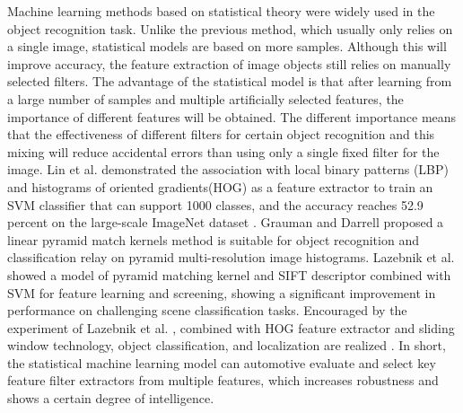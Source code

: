 \documentclass[10pt, a4paper]{article}
\begin{document}
\begin{multicols}{2}
	\par
	Machine learning methods based on statistical theory were widely used in the object recognition task. Unlike the previous method, which usually only relies on a single image, statistical models are based on more samples. Although this will improve accuracy, the feature extraction of image objects still relies on manually selected filters. The advantage of the statistical model is that after learning from a large number of samples and multiple artificially selected features, the importance of different features will be obtained. The different importance means that the effectiveness of different filters for certain object recognition and this mixing will reduce accidental errors than using only a single fixed filter for the image. Lin et al. \cite{lin2011large} demonstrated the association with local binary patterns (LBP) and histograms of oriented gradients(HOG) as a feature extractor to train an SVM classifier that can support 1000 classes, and the accuracy reaches 52.9 percent on the large-scale ImageNet dataset \cite{dalal2005histograms}\cite{wang2009hog}\cite{deng2009imagenet}. Grauman and Darrell \cite{grauman2005pyramid} proposed a linear pyramid match kernels method is suitable for object recognition and classification relay on pyramid multi-resolution image histograms. Lazebnik et al. \cite{lazebnik2006beyond} showed a model of pyramid matching kernel and SIFT descriptor combined with SVM for feature learning and screening, showing a significant improvement in performance on challenging scene classification tasks. Encouraged by the experiment of Lazebnik et al. \cite{lazebnik2006beyond}, combined with HOG feature extractor and sliding window technology, object classification, and localization are realized \cite{harzallah2009combining}. In short, the statistical machine learning model can automotive evaluate and select key feature filter extractors from multiple features, which increases robustness and shows a certain degree of intelligence.
	\par

\end{multicols}
\end{document}
